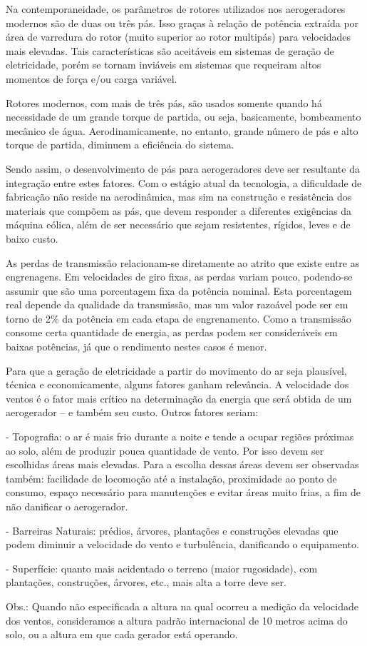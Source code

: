 \documentclass[12pt,openright,oneside,a4paper,brazil]{abntex2}
\begin{document}
\begin{enumerate}
Na contemporaneidade, os parâmetros de rotores utilizados nos aerogeradores modernos são de duas ou três pás. Isso graças à relação de potência extraída por área de varredura do rotor (muito superior ao rotor multipás) para velocidades mais elevadas. Tais características são aceitáveis em sistemas de geração de eletricidade, porém se tornam inviáveis em sistemas que requeiram altos momentos de força e/ou carga variável. 

	Rotores modernos, com mais de três pás, são usados somente quando há necessidade de um grande torque de partida, ou seja, basicamente, bombeamento mecânico de água. Aerodinamicamente, no entanto, grande número de pás e alto torque de partida, diminuem a eficiência do sistema. 

	Sendo assim, o desenvolvimento de pás para aerogeradores deve ser resultante da integração entre estes fatores. Com o estágio atual da tecnologia, a dificuldade de fabricação não reside na aerodinâmica, mas sim na construção e resistência dos materiais que compõem as pás, que devem responder a diferentes exigências da máquina eólica, além de ser necessário que sejam resistentes, rígidos, leves e de baixo custo.

	As perdas de transmissão relacionam-se diretamente ao atrito que existe entre as engrenagens. Em velocidades de giro fixas, as perdas variam pouco, podendo-se assumir que são uma porcentagem fixa da potência nominal. Esta porcentagem real depende da qualidade da transmissão, mas um valor razoável pode ser em torno de 2\% da potência em cada etapa de engrenamento. Como a transmissão consome certa quantidade de energia, as perdas podem ser consideráveis em baixas potências, já que o rendimento nestes casos é menor. 

	Para que a geração de eletricidade a partir do movimento do ar seja plausível, técnica e economicamente, alguns fatores ganham relevância. A velocidade dos ventos é o fator mais crítico na determinação da energia que será obtida de um aerogerador – e também seu custo. Outros fatores seriam:

- Topografia: o ar é mais frio durante a noite e tende a ocupar regiões próximas ao solo, além de produzir pouca quantidade de vento. Por isso devem ser escolhidas áreas mais elevadas. Para a escolha dessas áreas devem ser observadas também: facilidade de locomoção até a instalação, proximidade ao ponto de consumo, espaço necessário para manutenções e evitar áreas muito frias, a fim de não danificar o aerogerador.  

- Barreiras Naturais: prédios, árvores, plantações e construções elevadas que podem diminuir a velocidade do vento e turbulência, danificando o equipamento.

- Superfície: quanto mais acidentado o terreno (maior rugosidade), com plantações, construções, árvores, etc., mais alta a torre deve ser. 

Obs.: Quando não especificada a altura na qual ocorreu a medição da velocidade dos ventos, consideramos a altura padrão internacional de 10 metros acima do solo, ou a altura em que cada gerador está operando.  

\end{enumerate}
\end{document}
